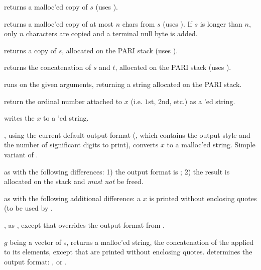 
 returns a malloc'ed copy of $s$
(uses ).

 returns a malloc'ed copy of
at most $n$ chars from $s$ (uses ). If $s$ is longer than
$n$, only $n$ characters are copied and a terminal null byte is added.

 returns a copy of $s$, allocated
on the PARI stack (uses ).

 returns the
concatenation of $s$ and $t$, allocated on the PARI stack (uses
).

 runs 
on the given arguments, returning a string allocated on the PARI stack.

 return the ordinal number attached to $x$
(i.e. $1$st, $2$nd, etc.) as a  'ed string.

 writes the  $x$ to a 'ed
string.

, using the current default output format
(, which contains the output style and the number of
significant digits to print), converts $x$ to a malloc'ed string. Simple
variant of .

 as  with the following
differences: 1) the output format is ; 2) the result is allocated
on the stack and \emph{must not} be freed.

 as  with the following
additional difference: a  $x$ is printed without enclosing quotes
(to be used by .

, as , except that
 overrides the output format from .

 $g$ being a vector of s,
returns a malloc'ed string, the concatenation of the  applied
to its elements, except that  are printed without enclosing quotes.
 determines the output format: , 
or .

